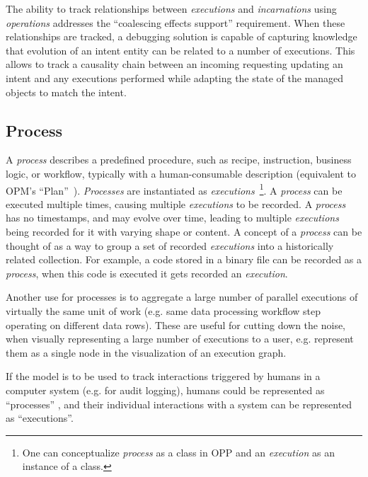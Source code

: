 The ability to track relationships between \textit{executions} and \textit{incarnations} using \textit{operations} addresses the ``coalescing effects support'' requirement. When these relationships are tracked, a debugging solution is capable of capturing knowledge that evolution of an intent entity can be related to a number of executions. This allows to track a causality chain between an incoming requesting updating an intent and any executions performed while adapting the state of the managed objects to match the intent.

\subsection{Process}\label{sec:model-process}

A \textit{process} describes a predefined procedure, such as recipe, instruction, business logic, or workflow, typically with a human-consumable description (equivalent to OPM's ``Plan''~\cite{opm-moreau2011743}). 
\textit{Processes} are instantiated as \textit{executions}~\footnote{One can conceptualize \textit{process} as a class in OPP and an \textit{execution} as an instance of a class.}. A \textit{process} can be executed multiple times, causing multiple \textit{executions} to be recorded. A \textit{process} has no timestamps, and may evolve over time, leading to multiple \textit{executions} being recorded for it with varying shape or content. A concept of a \textit{process} can be thought of as a way to group a set of recorded \textit{executions} into a historically related collection. For example, a code stored in a binary file can be recorded as a \textit{process}, when this code is executed it gets recorded an \textit{execution}.

Another use for processes is to aggregate a large number of parallel executions of virtually the same unit of work (e.g. same data processing workflow step operating on different data rows). These are useful for cutting down the noise, when visually representing a large number of executions to a user, e.g. represent them as a single node in the visualization of an execution graph.

If the model is to be used to track interactions triggered by humans in a computer system (e.g. for audit logging), humans could be represented as ``processes'' , and their individual interactions with a system can be represented as ``executions''.

